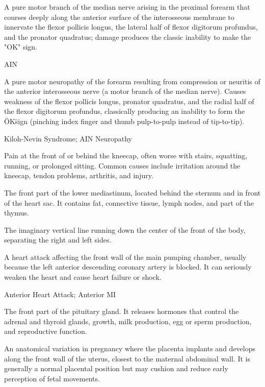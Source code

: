  A pure motor branch of the median nerve arising in the proximal forearm that courses deeply along the anterior surface of the interosseous membrane to innervate the flexor pollicis longus, the lateral half of flexor digitorum profundus, and the pronator quadratus; damage produces the classic inability to make the "OK" sign.

\synonyms
AIN

 A pure motor neuropathy of the forearm resulting from compression or neuritis of the anterior interosseous nerve (a motor branch of the median nerve). Causes weakness of the flexor pollicis longus, pronator quadratus, and the radial half of the flexor digitorum profundus, classically producing an inability to form the \"OK\" sign (pinching index finger and thumb pulp-to-pulp instead of tip-to-tip).

\synonyms
Kiloh-Nevin Syndrome; AIN Neuropathy

 Pain at the front of or behind the kneecap, often worse with stairs, squatting, running, or prolonged sitting. Common causes include irritation around the kneecap, tendon problems, arthritis, and injury.

 The front part of the lower mediastinum, located behind the sternum and in front of the heart sac. It contains fat, connective tissue, lymph nodes, and part of the thymus.

 The imaginary vertical line running down the center of the front of the body, separating the right and left sides.

 A heart attack affecting the front wall of the main pumping chamber, usually because the left anterior descending coronary artery is blocked. It can seriously weaken the heart and cause heart failure or shock.

\synonyms
Anterior Heart Attack; Anterior MI

 The front part of the pituitary gland. It releases hormones that control the adrenal and thyroid glands, growth, milk production, egg or sperm production, and reproductive function.

 An anatomical variation in pregnancy where the placenta implants and develops along the front wall of the uterus, closest to the maternal abdominal wall. It is generally a normal placental position but may cushion and reduce early perception of fetal movements.

